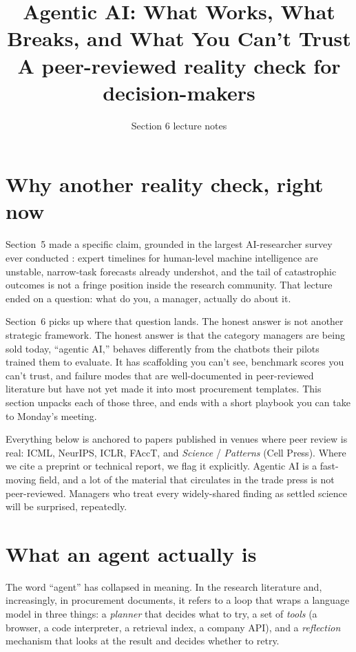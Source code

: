\documentclass[11pt]{article}
\title{Agentic AI: What Works, What Breaks, and What You Can't Trust\\
  {\large A peer-reviewed reality check for decision-makers}}
\author{Section 6 lecture notes}
\date{}
\begin{document}
\maketitle

\section*{Why another reality check, right now}

Section~5 made a specific claim, grounded in the largest AI-researcher
survey ever conducted \citep{grace2024thousands}: expert timelines for
human-level machine intelligence are unstable, narrow-task forecasts
already undershot, and the tail of catastrophic outcomes is not a
fringe position inside the research community. That lecture ended on
a question: what do you, a manager, actually do about it.

Section~6 picks up where that question lands. The honest answer is
not another strategic framework. The honest answer is that the
category managers are being sold today, ``agentic AI,'' behaves
differently from the chatbots their pilots trained them to evaluate.
It has scaffolding you can't see, benchmark scores you can't trust,
and failure modes that are well-documented in peer-reviewed literature
but have not yet made it into most procurement templates. This
section unpacks each of those three, and ends with a short playbook
you can take to Monday's meeting.

Everything below is anchored to papers published in venues where peer
review is real: ICML, NeurIPS, ICLR, FAccT, and \emph{Science} /
\emph{Patterns} (Cell Press). Where we cite a preprint or technical
report, we flag it explicitly. Agentic AI is a fast-moving field, and
a lot of the material that circulates in the trade press is not
peer-reviewed. Managers who treat every widely-shared finding as
settled science will be surprised, repeatedly.

\section{What an agent actually is}

The word ``agent'' has collapsed in meaning. In the research
literature and, increasingly, in procurement documents, it refers to
a loop that wraps a language model in three things: a \emph{planner}
that decides what to try, a set of \emph{tools} (a browser, a code
interpreter, a retrieval index, a company API), and a \emph{reflection}
mechanism that looks at the result and decides whether to retry.
\end{document}
